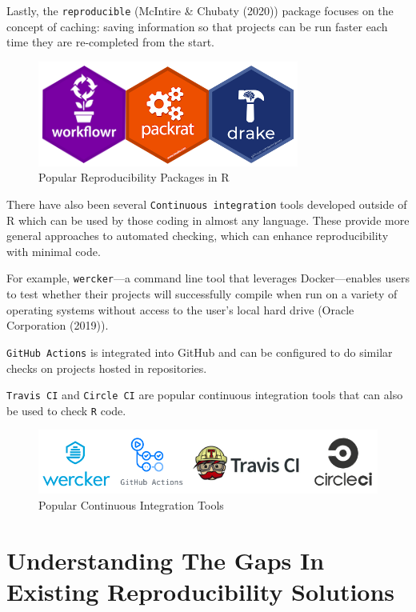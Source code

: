 \documentclass[12pt,twoside]{reedthesis}
\begin{document}
Lastly, the \texttt{reproducible} (McIntire \& Chubaty (2020)) package
focuses on the concept of caching: saving information so that projects
can be run faster each time they are re-completed from the start.
\begin{figure}

{\centering \includegraphics[width=0.5\linewidth]{figure/packages} 

}

\caption{Popular Reproducibility Packages in R}\label{fig:unnamed-chunk-5}
\end{figure}
There have also been several \texttt{Continuous\ integration} tools
developed outside of R which can be used by those coding in almost any
language. These provide more general approaches to automated checking,
which can enhance reproducibility with minimal code.

For example, \texttt{wercker}---a command line tool that leverages
Docker---enables users to test whether their projects will successfully
compile when run on a variety of operating systems without access to the
user's local hard drive (Oracle Corporation (2019)).

\texttt{GitHub\ Actions} is integrated into GitHub and can be configured
to do similar checks on projects hosted in repositories.

\texttt{Travis\ CI} and \texttt{Circle\ CI} are popular continuous
integration tools that can also be used to check \texttt{R} code.
\begin{figure}

{\centering \includegraphics[width=0.8\linewidth]{figure/ci-tools} 

}

\caption{Popular Continuous Integration Tools}\label{fig:unnamed-chunk-6}
\end{figure}
\section{Understanding The Gaps In Existing Reproducibility
Solutions}\label{understanding-the-gaps-in-existing-reproducibility-solutions}
\end{document}
